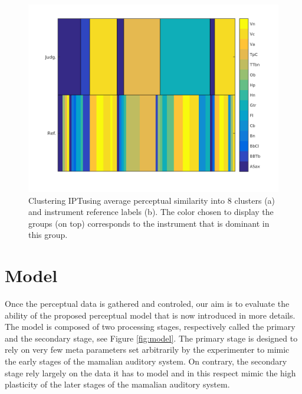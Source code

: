 \documentclass{article}
\newcommand{\ipt}{IPT}
\begin{document}
\begin{figure}
\center
\includegraphics[width = \textwidth]{figures/groupInstruments.png}
\caption{Clustering \ipt using average perceptual similarity into 8 clusters (a) and instrument reference labels (b). The color chosen to display the groups (on top) corresponds  to the instrument that is dominant in this group.}
\label{fig:gi}
\end{figure}

\section{Model}\label{sec:model}

Once the perceptual data is gathered and controled, our aim is to evaluate the ability of the proposed perceptual model that is now introduced in more details. The model is composed of two processing stages, respectively called the primary and the secondary stage, see Figure \ref{fig:model}. The primary stage is designed to rely on very few meta parameters set arbitrarily by the experimenter to mimic the early stages of the mamalian auditory system. On contrary, the secondary stage rely largely on the data it has to model and in this respect mimic the high plasticity of the later stages of the mamalian auditory system.
\end{document}
